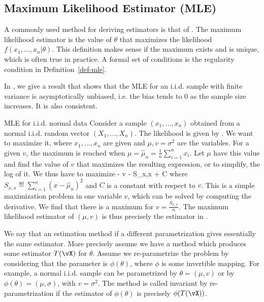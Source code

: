 \subsection{Maximum Likelihood Estimator (MLE)}
\label{sec-mle-defll} A commonly used method for
deriving estimators is that of . The maximum likelihood estimator is
the value of $\theta$ that maximizes the
likelihood $f(x_1,...,x_n|\theta)$. This
definition makes sense if the maximum exists and
is unique, which is often true in practice. A
formal set of conditions is the regularity
condition in Definition~\ref{def-mle}.

In , we give a result that shows that the MLE
for an i.i.d. sample with finite variance is asymptotically
unbiased, i.e. the bias tends to $0$ as the sample size
increases. It is also consistent.

\begin{ex}{MLE for i.i.d. normal data}
Consider a sample $(x_1, ..., x_n)$ obtained from a normal
i.i.d. random vector $(X_1, ...,X_n)$. The likelihood is given
by . We want to maximize it, where
 $x_1,...,x_n$ are given and $\mu, v=\sigma^2$ are the variables. For
 a given $v$, the maximum is reached when $\mu=\hat{\mu}_n=\frac{1}{n}\sum_{i=1}^n
 x_i$. Let $\mu$ have this value and find the value of $v$
 that maximizes the resulting expression, or to simplify, the log of it. We thus have to  maximize
 \be
- \ln v - S_{x,x} + C
 \ee where
 $S_{x,x}\eqdef\sum_{i=1}^n(x-\hat{\mu}_n)^2$ and $C$ is a constant with respect to $v$. This is a simple maximization problem in one variable $v$,
 which can be solved by computing the derivative. We find that
 there is a maximum for
 $v=\frac{S_{x,x}}{n}$. The maximum likelihood
 estimator of $(\mu,v)$ is thus precisely the estimator in
 .
\end{ex}

We say that an estimation method  if a different parametrization gives
essentially the same estimator. More precisely assume we have a
method which produces some estimator $T(\vX)$ for $\theta$.
 Assume we re-parametrize the problem by considering that the parameter is
 $\phi(\theta)$, where $\phi$ is some
 invertible mapping. For example, a normal i.i.d. sample can be parametrized by
 $\theta=(\mu, v)$ or by
 $\phi(\theta)=(\mu, \sigma)$, with $v=\sigma^2$.
The method is called invariant by re-parametrization if the
estimator of $\phi(\theta)$ is precisely $\phi(T(\vX))$.

